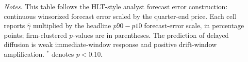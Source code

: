 \documentclass[11pt]{article}
\newcommand{\TableNote}[1]{%
    \par\vspace{0.35em}
    \begin{minipage}{0.96\textwidth}
    \footnotesize\emph{Notes.} #1
    \end{minipage}
}
\begin{document}
\begin{table}[!htbp]
\centering
\caption{HLT-Style PEAD Interaction Tests}
\label{tab:robots_pead_hlt}
\begin{threeparttable}
\scriptsize
{}
\TableNote{This table follows the HLT-style analyst forecast error
construction: continuous winsorized forecast error scaled by the
quarter-end price. Each cell reports \(\hat{\gamma}\) multiplied by the
headline \(p90-p10\) forecast-error scale, in percentage points; firm-clustered
\(p\)-values are in parentheses. The prediction of delayed diffusion is
weak immediate-window response and positive drift-window amplification.
\(^{*}\) denotes \(p<0.10\).}
\end{threeparttable}
\end{table}
\end{document}
